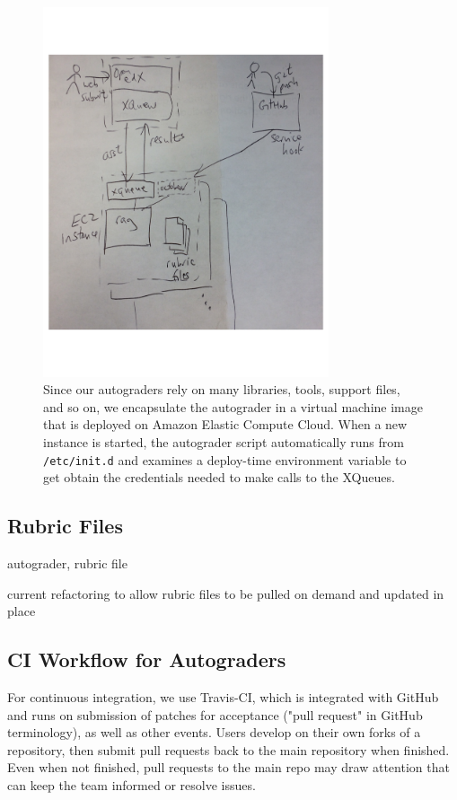 \begin{figure}
  \centering
  \includegraphics[width=0.75\textwidth]{figs/autograder_arch.pdf}
  \caption{\label{fig:arch}
  Since our autograders rely on many libraries,
  tools, support files, and so on, we encapsulate the autograder in a
  virtual machine image that is deployed on Amazon Elastic Compute Cloud.
  When a new instance is started, the autograder script automatically runs from
  \texttt{/etc/init.d} and examines a deploy-time environment variable
  to get obtain the credentials needed to make calls to the XQueues.}
\end{figure}


\subsection{Rubric Files}

autograder, rubric file

current refactoring to allow rubric files to be pulled on demand and
updated in place

\subsection{CI Workflow for Autograders}

For continuous integration, we use Travis-CI, which is integrated with GitHub and runs on submission of patches for acceptance ("pull request" in GitHub terminology), as well as other events. Users develop on their own forks of a repository, then submit pull requests back to the main repository when finished. Even when not finished, pull requests to the main repo may draw attention that can keep the team informed or resolve issues.

